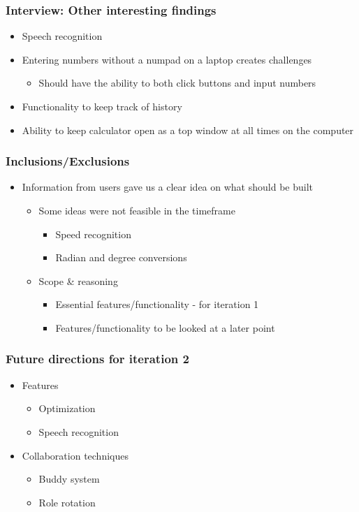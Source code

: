 \documentclass{beamer}
\begin{document}
  \begin{frame}
  \frametitle{Interview: Other interesting findings}
  \begin{itemize}
   \item Speech recognition
   \item Entering numbers without a numpad on a laptop creates challenges
       \begin{itemize}
     \item Should have the ability to both click buttons and input numbers
    \end{itemize}
   \item Functionality to keep track of history
   \item Ability to keep calculator open as a top window at all times on the computer
  \end{itemize}
  \end{frame}
  
  


  \begin{frame}
  \frametitle{Inclusions/Exclusions}
  \begin{itemize}
   \item Information from users gave us a clear idea on what should be built
    \begin{itemize}
    \item Some ideas were not feasible in the timeframe
    \begin{itemize}
      \item Speed recognition
      \item Radian and degree conversions
    \end{itemize}
    \item Scope \& reasoning
      \begin{itemize}
      \item Essential features/functionality - for iteration 1
      \item Features/functionality to be looked at a later point
    \end{itemize}
    \end{itemize}
    \end{itemize}
  \end{frame}


  \begin{frame}
  \frametitle{Future directions for iteration 2}
  \begin{itemize}
   \item Features
    \begin{itemize}
     \item Optimization
     \item Speech recognition
    \end{itemize}
   \item Collaboration techniques
    \begin{itemize}
     \item Buddy system
     \item Role rotation
    \end{itemize}
  \end{itemize}
  \end{frame}
\end{document}
